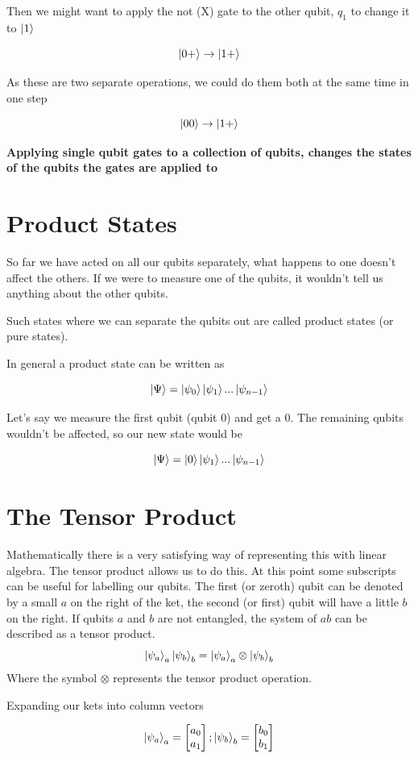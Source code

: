 Then we might want to apply the not (X) gate to the other qubit, $q_1$ to change it to $\ket{1}$

$$ \ket{0+} \rightarrow \ket{1+} $$

As these are two separate operations, we could do them both at the same time in one step 

$$  \ket{00} \rightarrow \ket{1+} $$

\textbf{Applying single qubit gates to a collection of qubits, changes the states of the qubits the gates are applied to}

\section{ Product States }

So far we have acted on all our qubits separately, what happens to one doesn't affect the others. If we were to measure one of the qubits, it wouldn't tell us anything about the other qubits. 

Such states where we can separate the qubits out are called product states (or pure states). 

In general a product state can be written as 

$$ \ket{\Psi} = \ket{\psi_0}\ket{\psi_1}...\ket{\psi_{n-1}}$$

Let's say we measure the first qubit (qubit 0) and get a 0. The remaining qubits wouldn't be affected, so our new state would be 

$$ \ket{\Psi} = \ket{0}\ket{\psi_1}...\ket{\psi_{n-1}}$$

\section{ The Tensor Product }

Mathematically there is a very satisfying way of representing this with linear algebra. The tensor product allows us to do this. At this point some subscripts can be useful for labelling our qubits. The first (or zeroth) qubit can be denoted by a small $a$ on the right of the ket, the second (or first) qubit will have a little $b$ on the right. If qubits $a$ and $b$ are not entangled, the system of $ab$ can be described as a tensor product. 
$$ \ket{\psi_a}_a\ket{\psi_b}_b = \ket{\psi_a}_a \otimes \ket{\psi_b}_b $$
Where the symbol $\otimes$ represents the tensor product operation. 

Expanding our kets into column vectors

$$ \ket{\psi_a}_a = \begin{bmatrix} a_0 \\ a_1 \end{bmatrix} ; \ket{\psi_b}_b = \begin{bmatrix} b_0 \\ b_1 \end{bmatrix} $$

